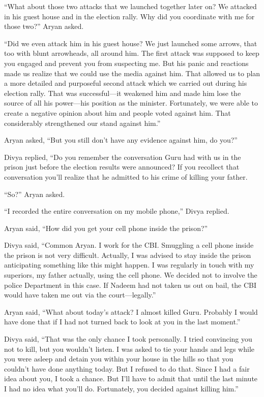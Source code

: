 “What about those two attacks that we launched together later on? We attacked in
his guest house and in the election rally. Why did you coordinate with me for
those two?” Aryan asked.

“Did we even attack him in his guest house? We just launched some arrows, that
too with blunt arrowheads, all around him. The first attack was supposed to keep
you engaged and prevent you from suspecting me. But his panic and reactions made
us realize that we could use the media against him. That allowed us to plan a
more detailed and purposeful second attack which we carried out during his
election rally. That was successful—it weakened him and made him lose the
source of all his power—his position as the minister. Fortunately, we were
able to create a negative opinion about him and people voted against him. That
considerably strengthened our stand against him.”

Aryan asked, “But you still don't have any evidence against him, do you?”

Divya replied, “Do you remember the conversation Guru had with us in the prison
just before the election results were announced? If you recollect that
conversation you'll realize that he admitted to his crime of killing your
father.

“So?” Aryan asked.

“I recorded the entire conversation on my mobile phone,” Divya replied.

Aryan said, “How did you get your cell phone inside the prison?”

Divya said, “Common Aryan. I work for the CBI. Smuggling a cell phone inside the
prison is not very difficult. Actually, I was advised to stay inside the prison
anticipating something like this might happen. I was regularly in touch with my
superiors, my father actually, using the cell phone. We decided not to involve
the police Department in this case. If Nadeem had not taken us out on bail, the
CBI would have taken me out via the court—legally.”

Aryan said, “What about today's attack? I almost killed Guru. Probably I would
have done that if I had not turned back to look at you in the last moment.”

Divya said, “That was the only chance I took personally. I tried convincing you
not to kill, but you wouldn't listen. I was asked to tie your hands and legs
while you were asleep and detain you within your house in the hills so that you
couldn't have done anything today. But I refused to do that. Since I had a fair
idea about you, I took a chance. But I'll have to admit that until the last
minute I had no idea what you'll do. Fortunately, you decided against killing
him.”

